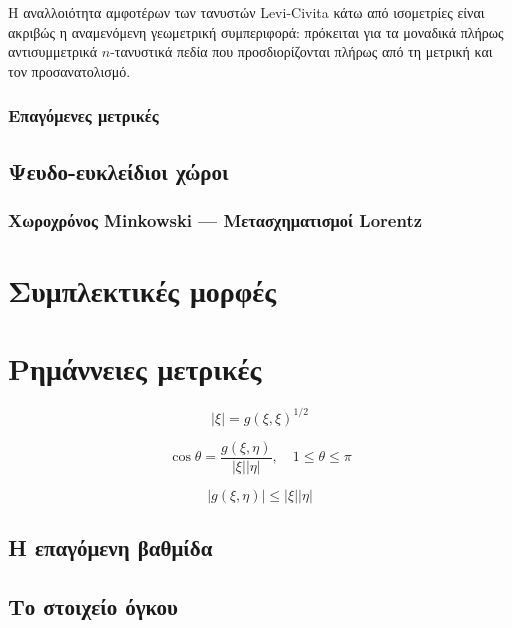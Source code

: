\documentclass[11pt,a4paper,twoside,openright]{book}
\begin{document}
\noindent
Η αναλλοιότητα αμφοτέρων των τανυστών Levi-Civita κάτω από ισομετρίες είναι ακριβώς η αναμενόμενη γεωμετρική συμπεριφορά: πρόκειται για τα μοναδικά πλήρως αντισυμμετρικά $n$-τανυστικά πεδία που προσδιορίζονται πλήρως από τη μετρική και τον προσανατολισμό.

\subsection{Επαγόμενες μετρικές}
	\label{sec:induced-metrics}

\section{Ψευδο-ευκλείδιοι χώροι}
	\label{sec:pseudo-euclidean-space}
	
\subsection{Χωροχρόνος Minkowski --- Mετασχηματισμοί Lorentz}
	\label{sec:minkowski-spaces}

\chapter{Συμπλεκτικές μορφές}
	\label{chapter:symplectic-forms}
	
\chapter{Ρημάννειες μετρικές}
	\label{chapter:riemannian-metrics}
	
\begin{equation}
\lvert\xi\rvert = g(\xi, \xi)^{1/2}
\end{equation}

\begin{equation}
\cos \theta = \frac{g(\xi, \eta)}{\lvert \xi \rvert \lvert \eta \rvert},
\quad
1 \le \theta \le \pi
\end{equation}

\begin{equation}
\lvert g(\xi, \eta) \rvert \le \lvert \xi \rvert \lvert \eta \rvert
\end{equation}

\section{Η επαγόμενη βαθμίδα}

\section{Το στοιχείο όγκου}
	\label{sec:volume-form}
\end{document}
